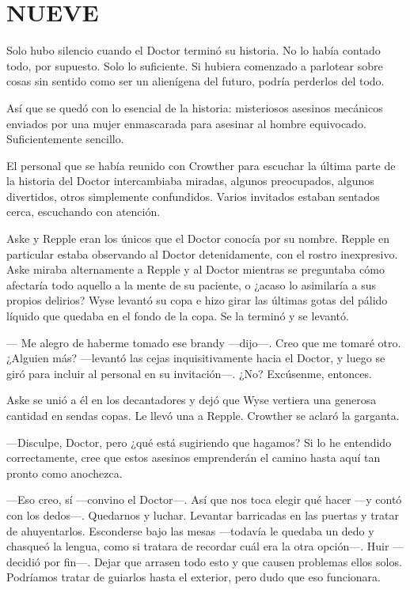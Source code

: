 \chapter*{NUEVE}

{Solo hubo silencio cuando el Doctor terminó su historia. No lo había
	contado todo, por supuesto. Solo lo suficiente. Si hubiera comenzado a
	parlotear sobre cosas sin sentido como ser un alienígena del futuro,
podría perderlos del todo.}

{Así que se quedó con lo esencial de la historia: misteriosos asesinos
	mecánicos enviados por una mujer enmascarada para asesinar al hombre
equivocado. Suficientemente sencillo.}

{El personal que se había reunido con Crowther para escuchar la última
	parte de la historia del Doctor intercambiaba miradas, algunos
	preocupados, algunos divertidos, otros simplemente confundidos. Varios
invitados estaban sentados cerca, escuchando con atención.}

{Aske y Repple eran los únicos que el Doctor conocía por su nombre.
	Repple en particular estaba observando al Doctor detenidamente, con el
	rostro inexpresivo. Aske miraba alternamente a Repple y al Doctor
	mientras se preguntaba cómo afectaría todo aquello a la mente de su
	paciente, o ¿acaso lo asimilaría a sus propios delirios? Wyse levantó
	su copa e hizo girar las últimas gotas del pálido líquido que quedaba en
el fondo de la copa. Se la terminó y se levantó.}

{--- Me alegro de haberme tomado ese brandy ---dijo---. Creo que me
	tomaré otro. ¿Alguien más? ---levantó las cejas inquisitivamente hacia
	el Doctor, y luego se giró para incluir al personal en su invitación---.
¿No? Excúsenme, entonces.}

{Aske se unió a él en los decantadores y dejó que Wyse vertiera una
	generosa cantidad en sendas copas. Le llevó una a Repple. Crowther se
aclaró la garganta.}

{---Disculpe, Doctor, pero ¿qué está sugiriendo que hagamos? Si lo he
	entendido correctamente, cree que estos asesinos emprenderán el camino
hasta aquí tan pronto como anochezca.}

{---Eso creo, sí ---convino el Doctor---. Así que nos toca elegir qué
	hacer ---y contó con los dedos---. Quedarnos y luchar. Levantar
	barricadas en las puertas y tratar de ahuyentarlos. Esconderse bajo las
	mesas ---todavía le quedaba un dedo y chasqueó la lengua, como si
	tratara de recordar cuál era la otra opción---. Huir ---decidió por
	fin---. Dejar que arrasen todo esto y que causen problemas ellos solos.
	Podríamos tratar de guiarlos hasta el exterior, pero dudo que eso
funcionara.}

